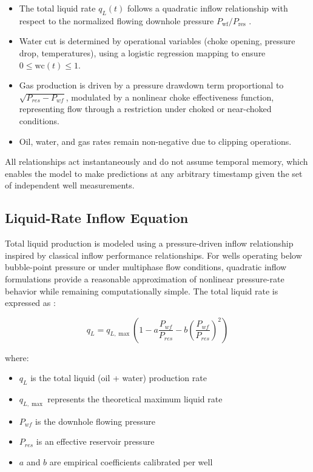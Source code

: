 \documentclass[12pt,APA]{uomthesis}
\begin{document}
\begin{itemize}
    \item The total liquid rate \(q_L(t)\) follows a quadratic inflow relationship
        with respect to the normalized flowing downhole pressure \(P_{\mathrm{wf}}/P_{\mathrm{res}}\) \citep{vogel1968inflow}.
    \item Water cut is determined by operational variables
        (choke opening, pressure drop, temperatures),
        using a logistic regression mapping to ensure \(0 \le \mathrm{wc}(t) \le 1\).
    \item Gas production is driven by a pressure drawdown term proportional to 
        \( \sqrt{P_{res} - P_{wf}} \), modulated by a nonlinear choke effectiveness function, 
        representing flow through a restriction under choked or near-choked conditions.
    \item Oil, water, and gas rates remain non-negative due to clipping operations.
\end{itemize}

All relationships act instantaneously and do not assume temporal memory,
which enables the model to make predictions at any arbitrary timestamp
given the set of independent well measurements.

\subsection{Liquid-Rate Inflow Equation}
\label{subsec:liquid_rate}
Total liquid production is modeled using a pressure-driven inflow relationship inspired by classical inflow performance relationships. For wells operating below bubble-point pressure or under multiphase flow conditions, quadratic inflow formulations provide a reasonable approximation of nonlinear pressure-rate behavior while remaining computationally simple.
The total liquid rate is expressed as \citep{vogel1968inflow}:

\begin{equation}
q_L = q_{L,\max}\left(1 - a \frac{P_{wf}}{P_{res}} - b \left(\frac{P_{wf}}{P_{res}}\right)^2 \right)
\end{equation}

where:
\begin{itemize}
    \item $q_L$ is the total liquid (oil + water) production rate
    \item $q_{L,\max}$ represents the theoretical maximum liquid rate
    \item $P_{wf}$ is the downhole flowing pressure
    \item $P_{res}$ is an effective reservoir pressure
    \item $a$ and $b$ are empirical coefficients calibrated per well
\end{itemize}
\end{document}
